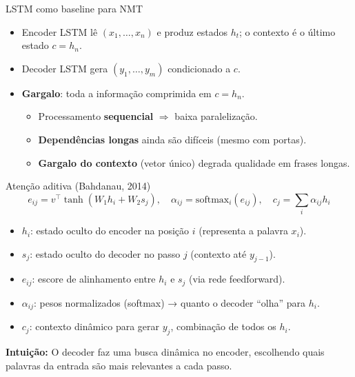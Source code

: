 \documentclass{beamer}
\begin{document}
\begin{frame}{LSTM como baseline para NMT}
	\begin{itemize}
		\item Encoder LSTM lê $(x_1,\dots,x_n)$ e produz estados $h_t$; o contexto é o último estado $c=h_n$.
		\item Decoder LSTM gera $(y_1,\dots,y_m)$ condicionado a $c$.
	\end{itemize}
	\begin{itemize}
		\item \textbf{Gargalo}: toda a informação comprimida em $c=h_n$.
		\begin{itemize}
			\item Processamento \textbf{sequencial} $\Rightarrow$ baixa paralelização.
			\item \textbf{Dependências longas} ainda são difíceis (mesmo com portas).
			\item \textbf{Gargalo do contexto} (vetor único) degrada qualidade em frases longas.
		\end{itemize}
	\end{itemize}
\end{frame}

\begin{frame}{Atenção aditiva (Bahdanau, 2014)}
\[
e_{ij} = v^\top \tanh(W_1 h_i + W_2 s_j),\quad
\alpha_{ij} = \mathrm{softmax}_i(e_{ij}),\quad
c_j = \sum_i \alpha_{ij} h_i
\]

\begin{itemize}
  \item $h_i$: estado oculto do encoder na posição $i$ (representa a palavra $x_i$).
  \item $s_j$: estado oculto do decoder no passo $j$ (contexto até $y_{j-1}$).
  \item $e_{ij}$: escore de alinhamento entre $h_i$ e $s_j$ (via rede feedforward).
  \item $\alpha_{ij}$: pesos normalizados (softmax) → quanto o decoder “olha” para $h_i$.
  \item $c_j$: contexto dinâmico para gerar $y_j$, combinação de todos os $h_i$.
\end{itemize}

\textbf{Intuição:} O decoder faz uma busca dinâmica no encoder, escolhendo quais palavras da entrada são mais relevantes a cada passo.
\end{frame}
\end{document}
